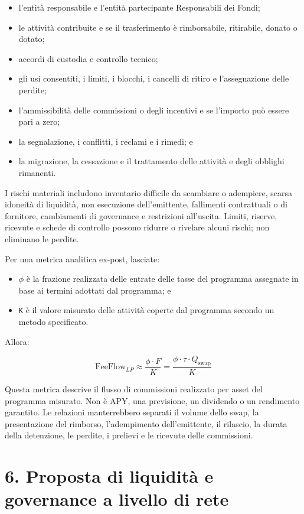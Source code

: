 \documentclass[11pt]{article}
\begin{document}
\begin{itemize}[leftmargin=*]
\item l'entità responsabile e l'entità partecipante Responsabili dei Fondi;
\item le attività contribuite e se il trasferimento è rimborsabile, ritirabile, donato o dotato;
\item accordi di custodia e controllo tecnico;
\item gli usi consentiti, i limiti, i blocchi, i cancelli di ritiro e l'assegnazione delle perdite;
\item l'ammissibilità delle commissioni o degli incentivi e se l'importo può essere pari a zero;
\item la segnalazione, i conflitti, i reclami e i rimedi; e
\item la migrazione, la cessazione e il trattamento delle attività e degli obblighi rimanenti.
\end{itemize}
I rischi materiali includono inventario difficile da scambiare o adempiere, scarsa idoneità di liquidità, non esecuzione dell'emittente, fallimenti contrattuali o di fornitore, cambiamenti di governance e restrizioni all'uscita. Limiti, riserve, ricevute e schede di controllo possono ridurre o rivelare alcuni rischi; non eliminano le perdite.

Per una metrica analitica ex-post, lasciate:

\begin{itemize}[leftmargin=*]
\item \texttt{$\phi$} è la frazione realizzata delle entrate delle tasse del programma assegnate in base ai termini adottati dal programma; e
\item \texttt{K} è il valore misurato delle attività coperte dal programma secondo un metodo specificato.
\end{itemize}
Allora:

\[
\mathrm{FeeFlow}_{LP} \approx \frac{\phi \cdot F}{K} = \frac{\phi \cdot \tau \cdot Q_{\mathrm{swap}}}{K}
\]

Questa metrica descrive il flusso di commissioni realizzato per asset del programma misurato. Non è APY, una previsione, un dividendo o un rendimento garantito. Le relazioni manterrebbero separati il volume dello swap, la presentazione del rimborso, l'adempimento dell'emittente, il rilascio, la durata della detenzione, le perdite, i prelievi e le ricevute delle commissioni.


\section*{6. Proposta di liquidità e governance a livello di rete}
\end{document}
